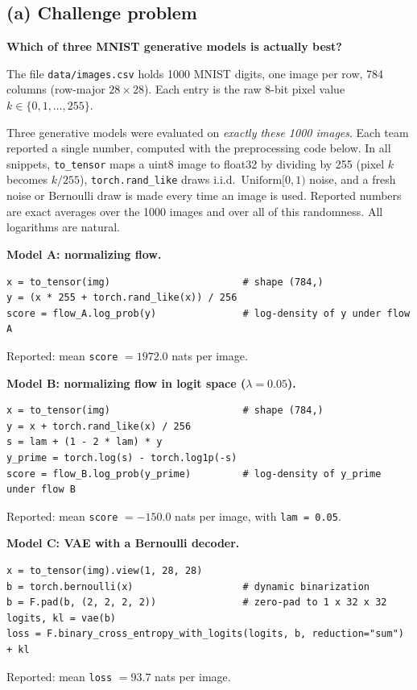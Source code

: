 \documentclass[11pt]{article}
\begin{document}
\subsection{(a) Challenge problem}

\textbf{Which of three MNIST generative models is actually best?}

The file \texttt{data/images.csv} holds 1000 MNIST digits, one image per row,
784 columns (row-major \(28\times28\)). Each entry is the raw 8-bit pixel value
\(k\in\{0,1,\dots,255\}\).

Three generative models were evaluated on \emph{exactly these 1000 images}.
Each team reported a single number, computed with the preprocessing code
below. In all snippets, \texttt{to\_tensor} maps a uint8 image to float32 by
dividing by 255 (pixel \(k\) becomes \(k/255\)), \texttt{torch.rand\_like}
draws i.i.d.\ \(\mathrm{Uniform}[0,1)\) noise, and a fresh noise or Bernoulli
draw is made every time an image is used. Reported numbers are exact averages
over the 1000 images and over all of this randomness. All logarithms are
natural.

\medskip\noindent\textbf{Model A: normalizing flow.}
\begin{verbatim}
x = to_tensor(img)                       # shape (784,)
y = (x * 255 + torch.rand_like(x)) / 256
score = flow_A.log_prob(y)               # log-density of y under flow A
\end{verbatim}
Reported: mean \texttt{score} \(=1972.0\) nats per image.

\medskip\noindent\textbf{Model B: normalizing flow in logit space (\(\lambda=0.05\)).}
\begin{verbatim}
x = to_tensor(img)                       # shape (784,)
y = x + torch.rand_like(x) / 256
s = lam + (1 - 2 * lam) * y
y_prime = torch.log(s) - torch.log1p(-s)
score = flow_B.log_prob(y_prime)         # log-density of y_prime under flow B
\end{verbatim}
Reported: mean \texttt{score} \(=-150.0\) nats per image, with \texttt{lam = 0.05}.

\medskip\noindent\textbf{Model C: VAE with a Bernoulli decoder.}
\begin{verbatim}
x = to_tensor(img).view(1, 28, 28)
b = torch.bernoulli(x)                   # dynamic binarization
b = F.pad(b, (2, 2, 2, 2))               # zero-pad to 1 x 32 x 32
logits, kl = vae(b)
loss = F.binary_cross_entropy_with_logits(logits, b, reduction="sum") + kl
\end{verbatim}
Reported: mean \texttt{loss} \(=93.7\) nats per image.
\end{document}
